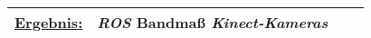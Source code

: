 \documentclass[12pt,a4paper,oneside,numbers=noenddot,captions=tableheading,toc=bibliography,openany,tikz,margin=5mm]{scrbook}
\begin{document}
\begin{longtable}{|p{}|p{}|p{7cm}|p{}|}
	\underline{Ergebnis:}\newline
	\newline
	\textbf{}%
	& \textit{ROS}\newline
	Bandmaß\newline
	\textit{Kinect-Kameras}
	\\
	\hline
\end{longtable} 
\end{document}
